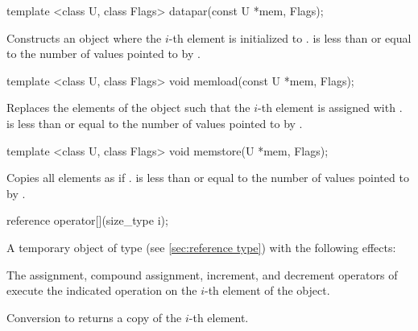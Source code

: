\begin{itemdecl}
template <class U, class Flags> datapar(const U *mem, Flags);
\end{itemdecl}
\begin{itemdescr}
  \pnum\effects Constructs an object where the $i$-th element is initialized to  \foralli.
  \pnum\requires {} is less than or equal to the number of values pointed to by .
\end{itemdescr}

\begin{itemdecl}
template <class U, class Flags> void memload(const U *mem, Flags);
\end{itemdecl}
\begin{itemdescr}
  \pnum\effects Replaces the elements of the \datapar object such that the $i$-th element is assigned with  \foralli.
  \pnum\requires {} is less than or equal to the number of values pointed to by .
\end{itemdescr}

\begin{itemdecl}
template <class U, class Flags> void memstore(U *mem, Flags);
\end{itemdecl}
\begin{itemdescr}
  \pnum\effects Copies all \datapar elements as if  \foralli.
  \pnum\requires {} is less than or equal to the number of values pointed to by .
\end{itemdescr}

\newcommand\dataparElementReference[1]{
  \pnum\returns A temporary object of type \referencetype (see \ref{sec:reference type}) with the following effects:

  \pnum\effects The assignment, compound assignment, increment, and decrement operators of \referencetype execute the indicated operation on the $i$-th element of the #1 object.

  \pnum\effects Conversion to \valuetype returns a copy of the $i$-th element.
}
\begin{itemdecl}
reference operator[](size_type i);
\end{itemdecl}
\begin{itemdescr}
  \dataparElementReference{\datapar{}}
\end{itemdescr}

